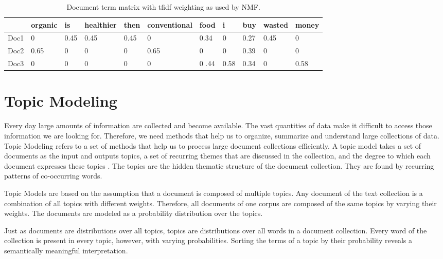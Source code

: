 \begin{table}[h]
	\begin{tabular}{lllllllllll}
		\toprule
		& organic & is & healthier & then & conventional & food & i &buy& wasted  & money \\ \midrule
		Doc1 & 0 	& 0.45  &   0.45      &  0.45   &  	0		 & 0.34  	& 0 &0.27  &  0.45   	&  0  \\
		Doc2 & 0.65 	& 0  &      0      &  0   & 0.65			 & 0  	& 0 &0.39  &  0   	&  0  \\
		Doc3 & 0 	& 0  &      0      &  0   & 0 			 & 0 .44 	& 0.58 &0.34  &  0    &  0.58   \\ \bottomrule
	\end{tabular}
	\caption[Sample \ac{tfidf} matrix]{Document term matrix with \ac{tfidf} weighting as used by \ac{NMF}.}
	\label{tab:doc_term_nmf}
\end{table}


\section{Topic Modeling}
\label{sec:topicmodel}
Every day large amounts of information are collected and become available. The vast quantities of data make it difficult to access those information we are looking for. Therefore, we need methods that help us to organize, summarize and understand large collections of data. Topic Modeling refers to a set of methods that help us to process large document collections efficiently. A topic model takes a set of documents as the input and outputs topics, a set of recurring themes that are discussed in the collection, and the degree to which each document expresses these topics \citep{Blei2003}. The topics are the hidden thematic structure of the document collection. They are found by recurring patterns of co-occurring words.

Topic Models are based on the assumption that a document is composed of multiple topics. Any document of the text collection is a combination of all topics with different weights. Therefore, all documents of one corpus are composed of the same topics by varying their weights. The documents are modeled as a probability distribution over the topics. 

Just as documents are distributions over all topics, topics are distributions over all words in a document collection. Every word of the collection is present in every topic, however, with varying probabilities. Sorting the terms of a topic by their probability reveals a semantically meaningful interpretation.

